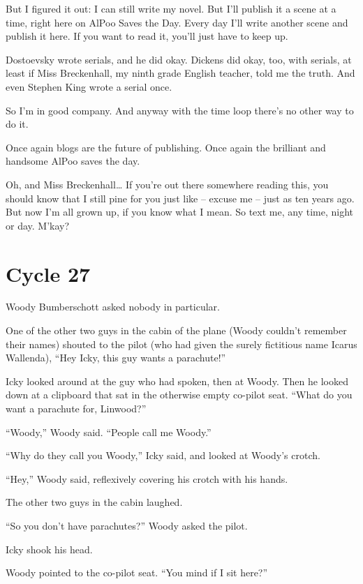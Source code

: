 But I figured it out: I can still write my novel. But I’ll publish it a scene at a time, right here on AlPoo Saves the Day. Every day I’ll write another scene and publish it here. If you want to read it, you’ll just have to keep up.

Dostoevsky wrote serials, and he did okay. Dickens did okay, too, with serials, at least if Miss Breckenhall, my ninth grade English teacher, told me the truth. And even Stephen King wrote a serial once.

So I’m in good company. And anyway with the time loop there’s no other way to do it.

Once again blogs are the future of publishing. Once again the brilliant and handsome AlPoo saves the day.

Oh, and Miss Breckenhall… If you’re out there somewhere reading this, you should know that I still pine for you just like – excuse me – just as ten years ago. But now I’m all grown up, if you know what I mean. So text me, any time, night or day. M’kay?

\chapter{Cycle 27}


 Woody Bumberschott asked nobody in particular.

One of the other two guys in the cabin of the plane (Woody couldn’t remember their names) shouted to the pilot (who had given the surely fictitious name Icarus Wallenda), “Hey Icky, this guy wants a parachute!”

Icky looked around at the guy who had spoken, then at Woody. Then he looked down at a clipboard that sat in the otherwise empty co-pilot seat. “What do you want a parachute for, Linwood?”

“Woody,” Woody said. “People call me Woody.”

“Why do they call you Woody,” Icky said, and looked at Woody’s crotch.

“Hey,” Woody said, reflexively covering his crotch with his hands.

The other two guys in the cabin laughed.

“So you don’t have parachutes?” Woody asked the pilot.

Icky shook his head.

Woody pointed to the co-pilot seat. “You mind if I sit here?”

